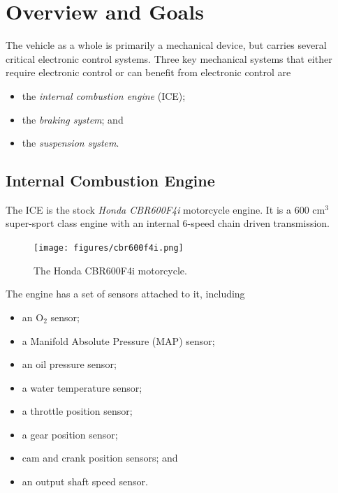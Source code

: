 %
%
%
%

\section{Overview and Goals}

The vehicle as a whole is primarily a mechanical device, but carries several critical electronic 
control systems. Three key mechanical systems that either require electronic control or can benefit 
from electronic control are

\begin{itemize}
\item the \emph{internal combustion engine} (ICE); 
\item the \emph{braking system}; and
\item the \emph{suspension system}.
\end{itemize}

\subsection{Internal Combustion Engine}


The ICE is the stock \emph{Honda CBR600F4i} motorcycle engine. It is a 600 cm$^3$ super-sport class engine with an internal 6-speed chain driven transmission. 

\begin{figure}[H]
	\centering
	 	\texttt{[image: figures/cbr600f4i.png]}
    \caption{The Honda CBR600F4i motorcycle.}
    \label{fig:cbr600f4i_cycle}
\end{figure}

The engine has a set of sensors attached to it, including

\begin{itemize}
\item an O$_{2}$ sensor;
\item a Manifold Absolute Pressure (MAP) sensor; 
\item an oil pressure sensor;
\item a water temperature sensor;
\item a throttle position sensor;
\item a gear position sensor;
\item cam and crank position sensors; and
\item an output shaft speed sensor.
\end{itemize}

